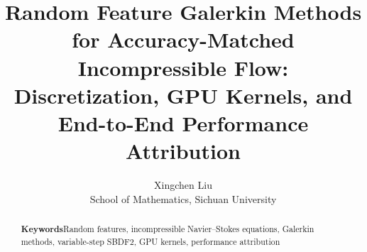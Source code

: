\documentclass[11pt]{article}
\title{Random Feature Galerkin Methods for Accuracy-Matched Incompressible Flow:\\Discretization, GPU Kernels, and End-to-End Performance Attribution}
\author{Xingchen Liu\\School of Mathematics, Sichuan University}
\date{}
\begin{document}
\maketitle
\begin{abstract}

\par\smallskip
\noindent\textbf{Keywords}\quad Random features, incompressible Navier--Stokes equations, Galerkin methods, variable-step SBDF2, GPU kernels, performance attribution
\end{abstract}




\FloatBarrier


\end{document}
